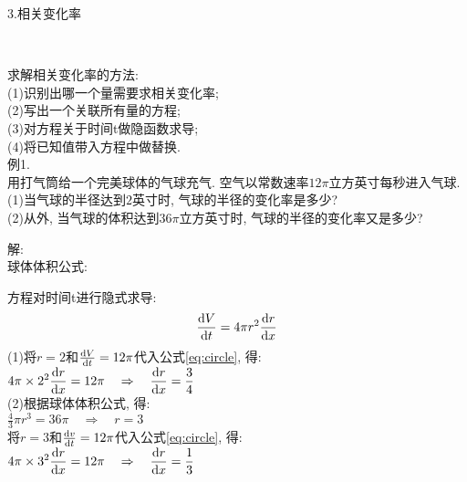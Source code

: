 3.相关变化率
{\par\centering
{}\\[2ex]
\par}

求解相关变化率的方法:\\
(1)识别出哪一个量需要求相关变化率;\\
(2)写出一个关联所有量的方程;\\
(3)对方程关于时间t做隐函数求导;\\
(4)将已知值带入方程中做替换.\\

例1.\\
用打气筒给一个完美球体的气球充气. 空气以常数速率$12\pi$立方英寸每秒进入气球.\\
(1)当气球的半径达到$2$英寸时, 气球的半径的变化率是多少?\\
(2)从外, 当气球的体积达到$36\pi$立方英寸时, 气球的半径的变化率又是多少?

解:\\
球体体积公式:\\[-2ex]
{\par\centering
{}
\par}
方程对时间t进行隐式求导:
\begin{equation}
\displaystyle\frac{\mathop{}\!\mathrm{d} V}{\mathop{}\!\mathrm{d} t}=4\pi r^2\frac{\mathop{}\!\mathrm{d} r}{\mathop{}\!\mathrm{d} x}\label{eq:circle}
\end{equation}
(1)将$r=2$和$\frac{\mathop{}\!\mathrm{d} V}{\mathop{}\!\mathrm{d} t}=12\pi$代入公式\eqref{eq:circle}, 得:\\[1ex]
\phantom{(1)}$\displaystyle 4\pi\times 2^2\frac{\mathop{}\!\mathrm{d} r}{\mathop{}\!\mathrm{d} x}=12\pi\quad\Rightarrow\quad\frac{\mathop{}\!\mathrm{d} r}{\mathop{}\!\mathrm{d} x}=\frac{3}{4}$\\[1ex]
(2)根据球体体积公式, 得:\\[1ex]
\phantom{(2)}$\displaystyle\frac{4}{3}\pi r^3=36\pi\quad\Rightarrow\quad r=3$\\[1ex]
\phantom{(2)}将$r=3$和$\frac{\mathop{}\!\mathrm{d} v}{\mathop{}\!\mathrm{d} t}=12\pi$代入公式\eqref{eq:circle}, 得:\\[1ex]
\phantom{(2)}$\displaystyle 4\pi\times 3^2\frac{\mathop{}\!\mathrm{d} r}{\mathop{}\!\mathrm{d} x}=12\pi\quad\Rightarrow\quad\frac{\mathop{}\!\mathrm{d} r}{\mathop{}\!\mathrm{d} x}=\frac{1}{3}$\\[2ex]

